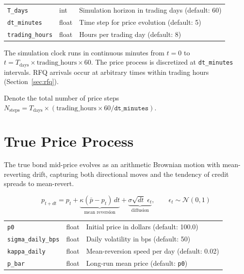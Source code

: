 \documentclass[11pt,a4paper]{article}
\begin{document}
\begin{parambox}[Knobs]
\begin{tabular}{@{}lll@{}}
\texttt{T\_days} & int & Simulation horizon in trading days (default: 60) \\
\texttt{dt\_minutes} & float & Time step for price evolution (default: 5) \\
\texttt{trading\_hours} & float & Hours per trading day (default: 8) \\
\end{tabular}
\end{parambox}

The simulation clock runs in continuous minutes from $t=0$ to $t = T_{\text{days}} \times \text{trading\_hours} \times 60$. The price process is discretized at \texttt{dt\_minutes} intervals. RFQ arrivals occur at arbitrary times within trading hours (Section~\ref{sec:rfq}).

Denote the total number of price steps $N_{\text{steps}} = T_{\text{days}} \times (\text{trading\_hours} \times 60 / \texttt{dt\_minutes})$.


\section{True Price Process}\label{sec:price}

The true bond mid-price evolves as an arithmetic Brownian motion with mean-reverting drift, capturing both directional moves and the tendency of credit spreads to mean-revert.

\begin{equation}
p_{t+dt} = p_t + \underbrace{\kappa(\bar{p} - p_t)\,dt}_{\text{mean reversion}} + \underbrace{\sigma \sqrt{dt}\;\epsilon_t}_{\text{diffusion}}, \qquad \epsilon_t \sim \mathcal{N}(0,1)
\end{equation}

\begin{parambox}[Knobs]
\begin{tabular}{@{}lll@{}}
\texttt{p0} & float & Initial price in dollars (default: 100.0) \\
\texttt{sigma\_daily\_bps} & float & Daily volatility in bps (default: 50) \\
\texttt{kappa\_daily} & float & Mean-reversion speed per day (default: 0.02) \\
\texttt{p\_bar} & float & Long-run mean price (default: \texttt{p0}) \\
\end{tabular}
\end{parambox}
\end{document}
